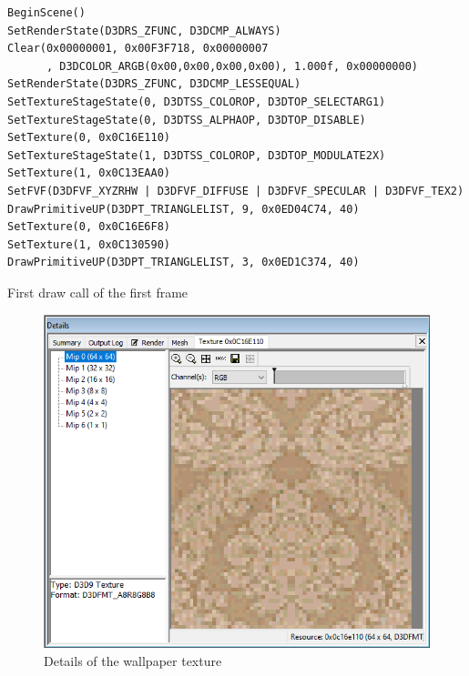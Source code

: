 \begin{appendix}
\begin{listing}[htbp]
\begin{verbatim}
BeginScene()
SetRenderState(D3DRS_ZFUNC, D3DCMP_ALWAYS)
Clear(0x00000001, 0x00F3F718, 0x00000007
      , D3DCOLOR_ARGB(0x00,0x00,0x00,0x00), 1.000f, 0x00000000)
SetRenderState(D3DRS_ZFUNC, D3DCMP_LESSEQUAL)
SetTextureStageState(0, D3DTSS_COLOROP, D3DTOP_SELECTARG1)
SetTextureStageState(0, D3DTSS_ALPHAOP, D3DTOP_DISABLE)
SetTexture(0, 0x0C16E110)
SetTextureStageState(1, D3DTSS_COLOROP, D3DTOP_MODULATE2X)
SetTexture(1, 0x0C13EAA0)
SetFVF(D3DFVF_XYZRHW | D3DFVF_DIFFUSE | D3DFVF_SPECULAR | D3DFVF_TEX2)
DrawPrimitiveUP(D3DPT_TRIANGLELIST, 9, 0x0ED04C74, 40)
SetTexture(0, 0x0C16E6F8)
SetTexture(1, 0x0C130590)
DrawPrimitiveUP(D3DPT_TRIANGLELIST, 3, 0x0ED1C374, 40)
\end{verbatim}
\caption[First draw call of the first frame]{First draw call of the first frame}
\label{lst:FirstFrameFirstDrawCalls}
\end{listing}




\begin{figure}[htbp]
	\centering
		\includegraphics[width=1.00\textwidth]{img/PIX/PIX_wallpaper_details.png}
	\caption[Details of the wallpaper texture]{Details of the wallpaper texture}
	\label{fig:PIXWallpaperDetails}
\end{figure}



\end{appendix}
